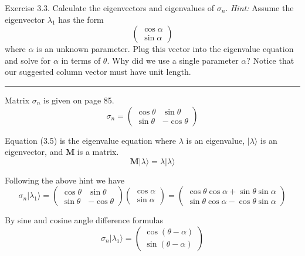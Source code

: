 \documentclass[12pt]{article}
\begin{document}
Exercise 3.3.
Calculate the eigenvectors and eigenvalues of $\sigma_n$.
{\it Hint:}
Assume the eigenvector $\lambda_1$ has the form
\begin{equation*}
\begin{pmatrix}\cos\alpha\\\sin\alpha\end{pmatrix}
\end{equation*}
where $\alpha$ is an unknown parameter.
Plug this vector into the eigenvalue equation and
solve for $\alpha$ in terms of $\theta$.
Why did we use a single parameter $\alpha$?
Notice that our suggested column vector must have unit length.

\bigskip
\hrule

\bigskip
Matrix $\sigma_n$ is given on page 85.
\begin{equation*}
\sigma_n=\begin{pmatrix}
\cos\theta & \sin\theta
\\
\sin\theta & -\cos\theta
\end{pmatrix}
\end{equation*}

Equation (3.5) is the eigenvalue equation where $\lambda$ is an eigenvalue,
$|\lambda\rangle$ is an eigenvector, and $\mathbf M$ is a matrix.
\begin{equation*}
\mathbf M|\lambda\rangle=\lambda|\lambda\rangle
\tag{3.5}
\end{equation*}

Following the above hint we have
\begin{equation*}
\sigma_n|\lambda_1\rangle=\begin{pmatrix}
\cos\theta & \sin\theta
\\
\sin\theta & -\cos\theta
\end{pmatrix}
\begin{pmatrix}\cos\alpha\\\sin\alpha\end{pmatrix}
=\begin{pmatrix}
\cos\theta\cos\alpha+\sin\theta\sin\alpha
\\
\sin\theta\cos\alpha-\cos\theta\sin\alpha
\end{pmatrix}
\end{equation*}

By sine and cosine angle difference formulas
\begin{equation*}
\sigma_n|\lambda_1\rangle
=\begin{pmatrix}
\cos(\theta-\alpha)
\\
\sin(\theta-\alpha)
\end{pmatrix}
\end{equation*}
\end{document}
